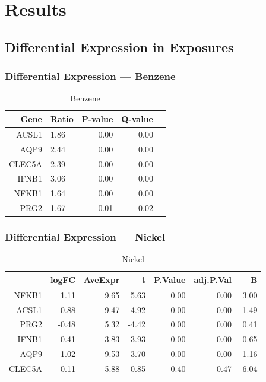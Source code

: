 \documentclass{beamer}
\begin{document}
\section{Results}
\subsection{Differential Expression in Exposures}

\begin{frame}[fragile]
  	\frametitle{Differential Expression --- Benzene}
 		\begin{table}[ht]
		\caption {Benzene} \label{tab:benzene} 
		\centering
		\begin{tabular}{rlrrr}
  			\hline
 			Gene & Ratio & P-value & Q-value \\ 
  			\hline
			ACSL1 & 1.86 & 0.00 & 0.00 \\ 
  			AQP9 & 2.44 & 0.00 & 0.00 \\ 
  			CLEC5A & 2.39 & 0.00 & 0.00 \\ 
  			IFNB1 & 3.06 & 0.00 & 0.00 \\ 
  			NFKB1 & 1.64 & 0.00 & 0.00 \\ 
  			PRG2 & 1.67 & 0.01 & 0.02 \\ 
   			\hline
		\end{tabular}
		\end{table}
\end{frame}

\begin{frame}[fragile]
  	\frametitle{Differential Expression --- Nickel}
 		\begin{table}[ht]
		\caption {Nickel} \label{tab:nickel} 
		\centering
		\begin{tabular}{rrrrrrr}
 			\hline
 			& logFC & AveExpr & t & P.Value & adj.P.Val & B \\ 
  			\hline
			NFKB1 & 1.11 & 9.65 & 5.63 & 0.00 & 0.00 & 3.00 \\ 
  			ACSL1 & 0.88 & 9.47 & 4.92 & 0.00 & 0.00 & 1.49 \\ 
  			PRG2 & -0.48 & 5.32 & -4.42 & 0.00 & 0.00 & 0.41 \\ 
  			IFNB1 & -0.41 & 3.83 & -3.93 & 0.00 & 0.00 & -0.65 \\ 
  			AQP9 & 1.02 & 9.53 & 3.70 & 0.00 & 0.00 & -1.16 \\ 
  			CLEC5A & -0.11 & 5.88 & -0.85 & 0.40 & 0.47 & -6.04 \\ 
  			 \hline
		\end{tabular}
		\end{table}
\end{frame}
\end{document}
